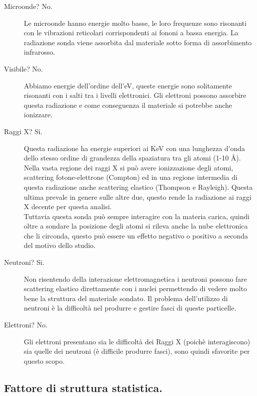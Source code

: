 \begin{description}
	\item[Microonde? No.] 
		Le microonde hanno energie molto basse, le loro frequenze sono risonanti con le vibrazioni reticolari corrispondenti ai fononi a bassa energia. 
		La radiazione sonda viene assorbita dal materiale sotto forma di assorbimento infrarosso.
	\item[Visibile? No.]
		Abbiamo energie dell'ordine dell'eV, queste energie sono solitamente risonanti con i salti tra i livelli elettronici.
		Gli elettroni possono assorbire questa radiazione e come conseguenza il materiale si potrebbe anche ionizzare. 
	\item[Raggi X? Si.]
		Questa radiazione ha energie superiori ai KeV con una lunghezza d'onda dello stesso ordine di grandezza della spaziatura tra gli atomi (1-10 \AA ). 
		Nella vasta regione dei raggi X si può avere ionizzazione degli atomi, scattering fotone-elettrone (Compton) ed in una regione intermedia di questa radiazione 
		anche scattering elastico (Thompson e Rayleigh). Questa ultima prevale in genere sulle altre due, questo rende la radiazione ai raggi X decente per questa analisi.\\
		Tuttavia questa sonda può sempre interagire con la materia carica, quindi oltre a sondare la posizione degli atomi si rileva anche la nube elettronica che li circonda,
		questo può essere un effetto negativo o positivo a seconda del motivo dello studio.
	\item[Neutroni? Si.]
		Non risentendo della interazione elettromagnetica i neutroni possono fare scattering elastico direttamente con i nuclei permettendo di vedere molto bene la struttura 
		del materiale sondato. Il problema dell'utilizzo di neutroni è la difficoltà nel produrre e gestire fasci di queste particelle.
	\item[Elettroni? No.] 
		Gli elettroni presentano sia le difficoltà dei Raggi X (poichè interagiscono) sia quelle dei neutroni (è difficile produrre fasci), sono quindi sfavorite per questo scopo.
\end{description}
\subsection{Fattore di struttura statistica.}
\label{subsec:Fattore di struttura statistica.}


